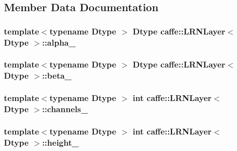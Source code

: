 \subsection{Member Data Documentation}
\hypertarget{classcaffe_1_1_l_r_n_layer_ae5a9eaf89e4082afe166f0fa7ee3b4ed}{
\subsubsection[{alpha\+\_\+}]{\setlength{\rightskip}{0pt plus 5cm}template$<$typename Dtype $>$ Dtype {\bf caffe\+::\+L\+R\+N\+Layer}$<$ Dtype $>$\+::alpha\+\_\+\hspace{0.3cm}{\ttfamily [protected]}}}\label{classcaffe_1_1_l_r_n_layer_ae5a9eaf89e4082afe166f0fa7ee3b4ed}
\hypertarget{classcaffe_1_1_l_r_n_layer_aa0765abb189bb6be067494ea5cc925f2}{
\subsubsection[{beta\+\_\+}]{\setlength{\rightskip}{0pt plus 5cm}template$<$typename Dtype $>$ Dtype {\bf caffe\+::\+L\+R\+N\+Layer}$<$ Dtype $>$\+::beta\+\_\+\hspace{0.3cm}{\ttfamily [protected]}}}\label{classcaffe_1_1_l_r_n_layer_aa0765abb189bb6be067494ea5cc925f2}
\hypertarget{classcaffe_1_1_l_r_n_layer_acd1bc62c5c9074c1df80f12d716f9a7a}{
\subsubsection[{channels\+\_\+}]{\setlength{\rightskip}{0pt plus 5cm}template$<$typename Dtype $>$ int {\bf caffe\+::\+L\+R\+N\+Layer}$<$ Dtype $>$\+::channels\+\_\+\hspace{0.3cm}{\ttfamily [protected]}}}\label{classcaffe_1_1_l_r_n_layer_acd1bc62c5c9074c1df80f12d716f9a7a}
\hypertarget{classcaffe_1_1_l_r_n_layer_a9fa09286b061a99713b4268259fdaad7}{
\subsubsection[{height\+\_\+}]{\setlength{\rightskip}{0pt plus 5cm}template$<$typename Dtype $>$ int {\bf caffe\+::\+L\+R\+N\+Layer}$<$ Dtype $>$\+::height\+\_\+\hspace{0.3cm}{\ttfamily [protected]}}}\label{classcaffe_1_1_l_r_n_layer_a9fa09286b061a99713b4268259fdaad7}
